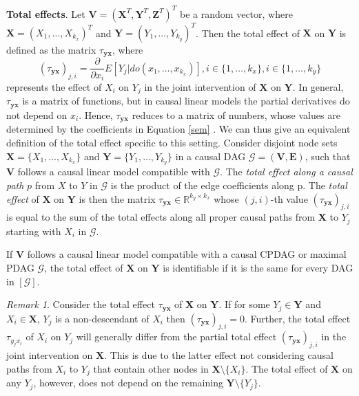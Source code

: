 \documentclass[11pt,a4paper]{article}
\theoremstyle{definition}
\theoremstyle{remark}
\newtheorem{Remark}[Satz]{Remark}
\newcommand{\mpdag}{maximal PDAG}
\newcommand{\g}[1][G]{\mathcal{#1}}
\newcommand{\vsp}{\vspace{.2cm}}
\begin{document}
\vsp\noindent\textbf{Total effects}. \citep[][]{pearl2009causality}
Let $\mathbf{V} = (\mathbf{X}^T, \mathbf{Y}^T, \mathbf{Z}^T)^T$ be a random vector, where $\mathbf{X} = (X_1, \dots, X_{k_x})^T$ and $\mathbf{Y}=(Y_1,
\dots, Y_{k_y})^T$. Then the total effect of $\mathbf{X}$ on $\mathbf{Y}$ is defined as the matrix $\tau_{\mathbf{yx}}$, where 
\[
(\tau_{\mathbf{yx}})_{j,i} = \frac{\partial}{\partial x_i} E[Y_j|do(x_1,\dots,x_{k_x})], i \in \{1,\dots,k_x\},i \in \{1,\dots,k_y\}
\]
represents the effect of $X_i$ on $Y_j$ in the joint intervention of $\mathbf{X}$ on $\mathbf{Y}$. 
In general, $\tau_{\mathbf{yx}}$ is a matrix of functions, but 
in causal linear models the partial derivatives do not depend on $x_i$. Hence, $\tau_{\mathbf{yx}}$ reduces to a matrix of numbers, whose values are determined by the coefficients in Equation \eqref{sem} \citep{wright1934method,nandy2017estimating}. We can thus give an equivalent definition of the total effect specific to this setting. 
Consider disjoint node sets $\mathbf{X}=\{X_1,\dots,X_{k_x}\}$ and $\mathbf{Y}=\{Y_1,\dots,Y_{k_y}\}$ in a causal DAG $\g=(\mathbf{V},\mathbf{E})$, such that $\mathbf{V}$ follows a causal linear model compatible with $\g$. 
The \textit{total effect along a causal path} $p$ from $X$ to $Y$ in $\g$ is the product of the edge coefficients along p. %
The \textit{total effect} of $\mathbf{X}$ on $\mathbf{Y}$ is then the matrix $\tau_{\mathbf{yx}} \in \mathbb{R}^{k_y \times k_x}$ whose $(j,i)$-th value $(\tau_{\mathbf{yx}})_{j,i}$ is equal to the sum of the total effects along all proper causal paths from $\mathbf{X}$ to $Y_j$ starting with $X_i$ in $\g$. 

If $\mathbf{V}$ follows a causal linear model compatible with a causal CPDAG or \mpdag{} $\g$, the total effect of $\mathbf{X}$ on $\mathbf{Y}$ is identifiable if it is the same for every DAG in $[\g]$. 



\begin{Remark}
	Consider the total effect $\tau_{\mathbf{yx}}$ of $\mathbf{X}$ on $\mathbf{Y}$. If for some $Y_j \in \mathbf{Y}$ and $X_i \in \mathbf{X}$, $Y_j$ is a non-descendant of $X_i$ then $(\tau_{\mathbf{yx}})_{j,i} = 0$.
	Further, the total effect $\tau_{y_jx_i}$ of $X_i$ on $Y_j$ will generally differ from the partial total effect $(\tau_{\mathbf{yx}})_{j,i}$ in the joint intervention on $\mathbf{X}$. This is due to the latter effect not considering causal paths from $X_i$ to $Y_j$ that contain other nodes in $\mathbf{X}\setminus\{X_i\}$. The total effect of $\mathbf{X}$ on any $Y_j$, however, does not depend on the remaining $\mathbf{Y} \setminus \{Y_j\}$.
	\label{remark: joint vs non}
\end{Remark}
\end{document}
